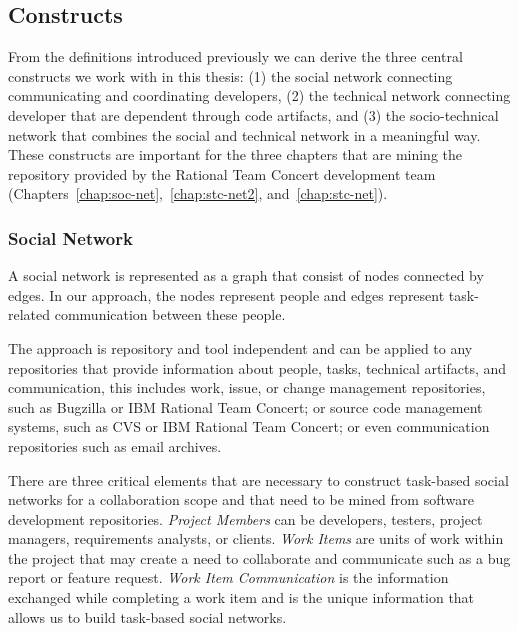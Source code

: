 \subsection{Constructs}
\label{c5:sec:constructs}
From the definitions introduced previously we can derive the three central constructs we work with in this thesis: (1) the social network connecting communicating and coordinating developers, (2) the technical network connecting developer that are dependent through code artifacts, and (3) the socio-technical network that combines the social and technical network in a meaningful way.
These constructs are important for the three chapters that are mining the repository provided by the Rational Team Concert development team (Chapters~\ref{chap:soc-net},~\ref{chap:stc-net2}, and~\ref{chap:stc-net}).

\subsubsection{Social Network}
A social network is represented as a graph that consist of nodes connected by edges. 
In our approach, the nodes represent people and edges represent task-related communication between these people.

The approach is repository and tool independent and can be applied to any repositories that provide information about people, tasks, technical artifacts, and communication, this includes work, issue, or change management repositories, such as Bugzilla or IBM Rational Team Concert; or source code management systems, such as CVS or IBM Rational Team Concert; or even communication repositories such as email archives.

There are three critical elements that are necessary to construct task-based social networks for a collaboration scope and that need to be mined from software development repositories.
\emph{Project Members}  can be developers, testers, project managers, requirements analysts,
or clients. 
\emph{Work Items} are units of work within the project that may create a need to collaborate and communicate such as a bug report or feature request.
\emph{Work Item Communication} is the information exchanged while completing a work item and is the unique information that allows us to build task-based social networks.


